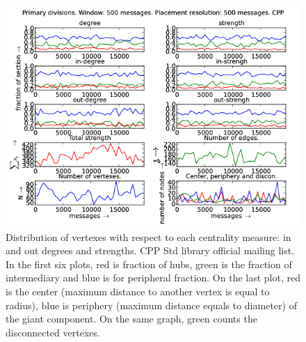 \documentclass[%
 aip,
 jmp,%
 amsmath,amssymb,
 reprint,%
]{revtex4-1}
\begin{document}
\begin{figure}[hbtp] 
   \centering
        \includegraphics[width=\textwidth]{figs/CPP/500}
    \caption{Distribution of vertexes with respect to each centrality measure: in and out degrees and strengths. CPP Std library official mailing list. In the first six plots, red is fraction of hubs, green is the fraction of intermediary and blue is for peripheral fraction. On the last plot, red is the center (maximum distance to another vertex is equal to radius), blue is periphery (maximum distance equals to diameter) of the giant component. On the same graph, green counts the disconnected vertexes.}
    \label{fig:cpp500}
\end{figure}
\end{document}
